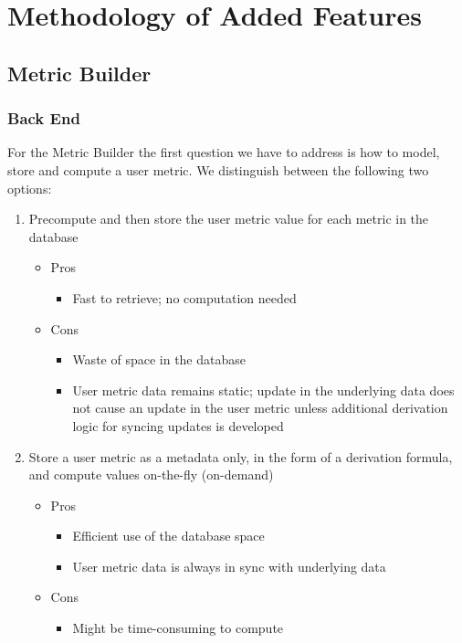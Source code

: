 \chapter{Methodology of Added Features}

	\section{Metric Builder}

		\subsection{Back End}

			For the Metric Builder the first question we have to address is how to model, store and compute a user metric.
			We distinguish between the following two options:

			\begin{enumerate}[itemsep=-1.5mm]
				\item
					Precompute and then store the user metric value for each metric in the database
					\begin{itemize}[itemsep=-1.5mm]
						\item
							Pros
							\begin{itemize}
								\item
									Fast to retrieve; no computation needed
							\end{itemize}
						\item
							Cons
							\begin{itemize}
								\item
									Waste of space in the database
								\item
									User metric data remains static;
									update in the underlying data does not cause an update in the user metric unless additional derivation logic for syncing updates is developed 
							\end{itemize}
					\end{itemize}
				\item
					Store a user metric as a metadata only, in the form of a derivation formula, and compute values on-the-fly (on-demand)
					\begin{itemize}[itemsep=-1.5mm]
						\item
							Pros
							\begin{itemize}
								\item
									Efficient use of the database space
								\item
									User metric data is always in sync with underlying data
							\end{itemize}
						\item
							Cons
							\begin{itemize}
								\item
									Might be time-consuming to compute
							\end{itemize}
					\end{itemize}
			\end{enumerate}

